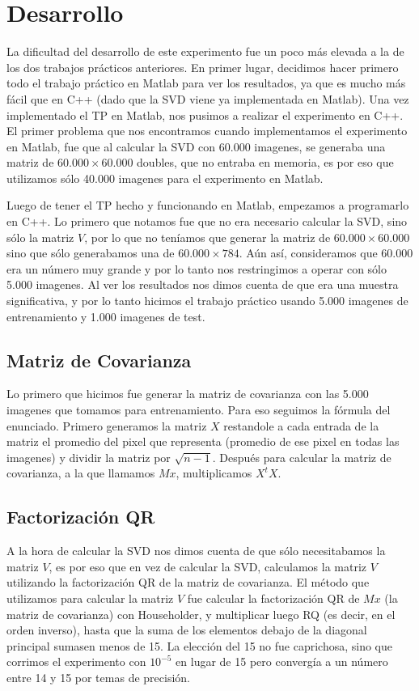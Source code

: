 \section{Desarrollo}
La dificultad del desarrollo de este experimento fue un poco m\'as elevada a la de los dos trabajos pr\'acticos anteriores. En primer lugar, decidimos hacer primero todo el trabajo pr\'actico en Matlab para ver los resultados, ya que es mucho m\'as f\'acil que en C++ (dado que la SVD viene ya implementada en Matlab). Una vez implementado el TP en Matlab, nos pusimos a realizar el experimento en C++. El primer problema que nos encontramos cuando implementamos el experimento en Matlab, fue que al calcular la SVD con 60.000 imagenes, se generaba una matriz de $60.000 \times 60.000$ doubles, que no entraba en memoria, es por eso que utilizamos s\'olo 40.000 imagenes para el experimento en Matlab.

Luego de tener el TP hecho y funcionando en Matlab, empezamos a programarlo en C++. Lo primero que notamos fue que no era necesario calcular la SVD, sino s\'olo la matriz $V$, por lo que no ten\'iamos que generar la matriz de $60.000 \times 60.000$ sino que s\'olo generabamos una de $60.000 \times 784$. A\'un as\'i, consideramos que 60.000 era un n\'umero muy grande y por lo tanto nos restringimos a operar con s\'olo 5.000 imagenes. Al ver los resultados nos dimos cuenta de que era una muestra significativa, y por lo tanto hicimos el trabajo pr\'actico usando 5.000 imagenes de entrenamiento y 1.000 imagenes de test.

\subsection{Matriz de Covarianza}
Lo primero que hicimos fue generar la matriz de covarianza con las 5.000 imagenes que tomamos para entrenamiento. Para eso seguimos la f\'ormula del enunciado. Primero generamos la matriz $X$ restandole a cada entrada de la matriz el promedio del pixel que representa (promedio de ese pixel en todas las imagenes) y dividir la matriz por $\sqrt{n-1}$. Despu\'es para calcular la matriz de covarianza, a la que llamamos $Mx$, multiplicamos $X^tX$.

\subsection{Factorizaci\'on QR}
A la hora de calcular la SVD nos dimos cuenta de que s\'olo necesitabamos la matriz $V$, es por eso que en vez de calcular la SVD, calculamos la matriz $V$ utilizando la factorizaci\'on QR de la matriz de covarianza. El m\'etodo que utilizamos para calcular la matriz $V$ fue calcular la factorizaci\'on QR de $Mx$ (la matriz de covarianza) con Householder, y multiplicar luego RQ (es decir, en el orden inverso), hasta que la suma de los elementos debajo de la diagonal principal sumasen menos de 15. La elecci\'on del 15 no fue caprichosa, sino que corrimos el experimento con $10^{-5}$ en lugar de 15 pero converg\'ia a un n\'umero entre 14 y 15 por temas de precisi\'on.

